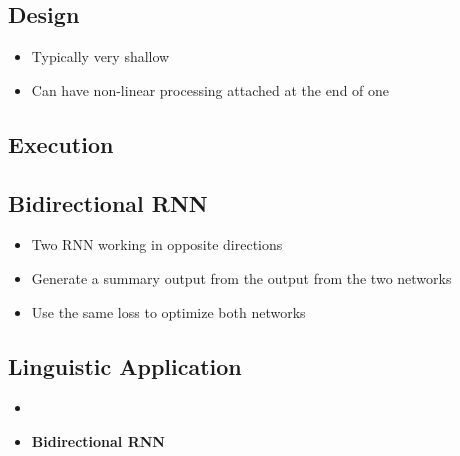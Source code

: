   \subsection{Design}

    \begin{itemize}
      \item Typically very shallow
      \item Can have non-linear processing attached at the end of one
    \end{itemize}

  \subsection{Execution}

  \subsection{Bidirectional RNN}

    \begin{itemize}
      \item Two RNN working in opposite directions
      \item Generate a summary output from the output from the two networks
      \item Use the same loss to optimize both networks
    \end{itemize}

  \subsection{Linguistic Application}

    \begin{itemize}
      \item
      \item \textbf{Bidirectional RNN}
    \end{itemize}